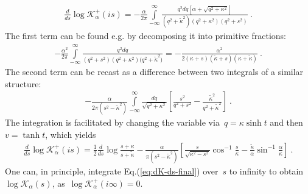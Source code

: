 \documentclass[preprint,aps,eqsecnum, prb]{revtex4-1}
\newcommand{\fplus}[1]{{#1}^{+}}
\begin{document}
\begin{align}
  \frac{d}{ds} \log \fplus{\mathcal{K}}_{\alpha}(is)
  = - \frac{\alpha}{2\pi}
  \int\limits_{-\infty}^{\infty}
  \frac{q^2 dq \left[\alpha + \sqrt{q^2 + \kappa^2}\right]}{
     (q^2 + {\tilde \kappa}^2) (q^2 + \kappa^2) (q^2 + s^2)
  }\ .
\end{align}
The first term can be found e.g. by decomposing it
into primitive fractions:
\begin{align}
  -\frac{\alpha^2}{2\pi}\int\limits_{-\infty}^{\infty}
  \frac{q^2 dq}{(q^2 + s^2) (q^2 + \kappa^2)
  (q^2 + {\tilde{\kappa}^2)}} =
  -\frac{\alpha^2}{2(\kappa + s) ({\tilde{\kappa}} + s)
  (\kappa + {\tilde\kappa})}\ .
\end{align}
The second term can be recast as a difference between
two integrals of a similar structure:
\begin{align}
  -\frac{\alpha}{2\pi(s^2 - \tilde{\kappa}^2)}
  \int\limits_{-\infty}^{\infty}
  \frac{dq}{\sqrt{q^2 + \kappa^2}}
  \left[\frac{s^2}{q^2 + s^2}
  - \frac{\tilde{\kappa}^2}{q^2 + {\tilde\kappa}^2}\right]\ .
\end{align}
The integration is facilitated by changing the variable
via~$q = \kappa \sinh t$ and then~$v = \tanh t$,
which yields
\begin{align}
  \label{eq:dK-ds-final}
  \frac{d}{ds} \log \fplus{\mathcal{K}}_{\alpha}(is) =
  \frac{1}{2}\frac{d}{ds} \log\frac{s + \kappa}{s + \tilde{\kappa}}
  - \frac{\alpha}{\pi (s^2 -\tilde{\kappa}^2)}
  \left[\frac{s}{\sqrt{\kappa^2 - s^2}} \cos^{-1}\frac{s}{\kappa}
  - \frac{{\tilde{\kappa}}}{\alpha}
  \sin^{-1}\frac{\alpha}{\kappa}\right]
  \ .
\end{align}
One can, in principle, integrate Eq.(\ref{eq:dK-ds-final})
over~$s$ to infinity to obtain~$\log\mathcal{K}_\alpha(s)$,
as~$\log\fplus{\mathcal{K}}_\alpha(i\infty) = 0$.
\end{document}
